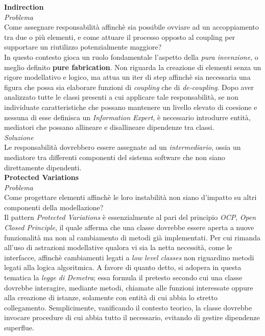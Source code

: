 \documentclass{article}
\begin{document}
\textbf{Indirection}\vspace*{7pt}\\
\textit{Problema}\\
Come assegnare responsabilità affinchè sia possibile ovviare ad un accoppiamento tra due o più elementi, e come attuare il processo opposto al coupling per supportare un riutilizzo potenzialmente maggiore?\vspace*{14pt}\\
In questo contesto gioca un ruolo fondamentale l'aspetto della \textit{pura invenzione}, o meglio definito \textbf{pure fabrication}. Non riguarda la creazione di elementi senza un rigore modellativo e logico, ma attua un iter di step affinchè sia necessaria una figura che possa sia elaborare funzioni di \textit{coupling} che di \textit{de-coupling}. Dopo aver analizzato tutte le classi presenti a cui applicare tale responsabilità, se non individuate caratteristiche che possano mantenere un livello elevato di coesione e nessuna di esse definisca un \textit{Information Expert}, è necessario introdurre entità, mediatori che possano allineare e disallineare dipendenze tra classi.\vspace*{14pt}\\
\textit{Soluzione}\\
Le responsabilità dovrebbero essere assegnate ad un \textit{intermediario}, ossia un mediatore tra differenti componenti del sistema software che non siano direttamente dipendenti.\vspace*{14pt}\\
\textbf{Protected Variations}\vspace*{7pt}\\
\textit{Problema}\\
Come progettare elementi affinchè le loro instabilità non siano d'impatto su altri componenti della modellazione?\vspace*{14pt}\\
Il pattern \textit{Protected Variations} è essenzialmente al pari del principio \textit{OCP}, \textit{Open Closed Principle}, il quale afferma che una classe dovrebbe essere aperta a nuove funzionalità ma non al cambiamento di metodi già implementati. Per cui rimanda all'uso di astrazioni modellative qualora vi sia la netta necessità, come le interfacce, affinchè cambiamenti legati a \textit{low level classes} non riguardino metodi legati alla logica algoritmica. A favore di quanto detto, si adopera in questa tematica la \textit{legge di Demetra}; essa formula il pretesto secondo cui una classe dovrebbe interagire, mediante metodi, chiamate alle funzioni interessate oppure alla creazione di istanze, solamente con entità di cui abbia lo stretto collegamento. Semplicimente, vanificando il contesto teorico, la classe dovrebbe invocare procedure di cui abbia tutto il necessario, evitando di gestire dipendenze superflue.\vspace*{14pt}\\
\end{document}
